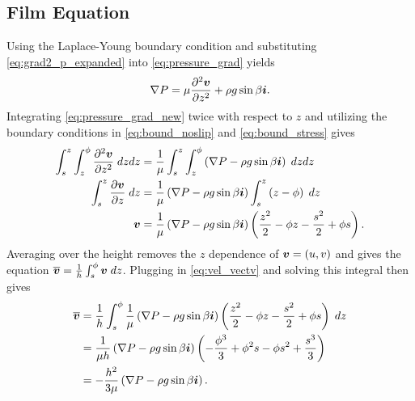 \subsection{Film Equation}
Using the Laplace-Young boundary condition and substituting \cref{eq:grad2_p_expanded} into \cref{eq:pressure_grad} yields 
\begin{align}
    \nabla P = \mu \frac{\partial^2 \boldsymbol{v}}{\partial z^2} + \rho g \sin\beta \boldsymbol{i}. 
    \label{eq:pressure_grad_new}
\end{align}
Integrating \cref{eq:pressure_grad_new} twice with respect to $z$ and utilizing the boundary conditions in
\cref{eq:bound_noslip} and \cref{eq:bound_stress} gives
\begin{align}
    \nonumber \int_{s}^{z}\int_{z}^{\phi} \frac{\partial^2 \boldsymbol{v}}{\partial z^2} \; dzdz &= \frac{1}{\mu}\int_{s}^{z}\int_{z}^{\phi} \left( \nabla P - \rho g \sin\beta\boldsymbol{i} \right) \; dzdz \\
    \nonumber \int_{s}^{z} \frac{\partial \boldsymbol{v}}{\partial z} \; dz &= \frac{1}{\mu} \left( \nabla P - \rho g \sin\beta\boldsymbol{i} \right) \int_{s}^{z} \left( z - \phi \right) \; dz\\
    \boldsymbol{v} &=\frac{1}{\mu} \left( \nabla P - \rho g \sin\beta\boldsymbol{i} \right) \left( \frac{z^2}{2} - \phi z - \frac{s^2}{2} + \phi s \right). 
    \label{eq:vel_vectv}
\end{align}
Averaging over the height removes the $z$ dependence of $\boldsymbol{v} = \left( u, v \right)$ and gives the equation 
$\overline{\boldsymbol{v}} = \frac{1}{h} \int_{s}^{\phi} \boldsymbol{v} \; dz$.
Plugging in \cref{eq:vel_vectv} and solving this integral then gives 
\begin{align}
    \nonumber \overline{\boldsymbol{v}} &= \frac{1}{h} \int_{s}^{\phi} \frac{1}{\mu} \left( \nabla P - \rho g \sin\beta\boldsymbol{i} \right) \left( \frac{z^2}{2} - \phi z - \frac{s^2}{2} + \phi s \right)  \; dz\\
    \nonumber &= \frac{1}{\mu h} \left( \nabla P - \rho g \sin\beta\boldsymbol{i} \right) \left( -\frac{\phi^3}{3} + \phi^2s - \phi s^2 + \frac{s^3}{3} \right)\\
    &= -\frac{h^2}{3\mu} \left( \nabla P - \rho g \sin\beta\boldsymbol{i} \right).
    \label{eq:uv_bar}
\end{align}

